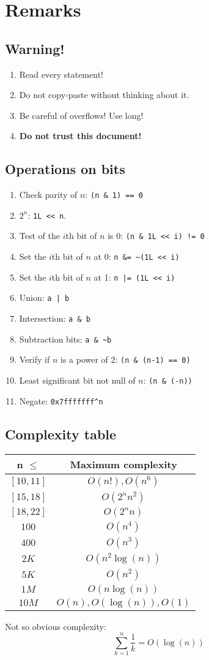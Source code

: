 \section{Remarks}
\subsection{Warning!}
\begin{enumerate}
	\item Read every statement!
	\item Do not copy-paste without thinking about it.
	\item Be careful of overflows! Use long!
	\item \textbf{Do not trust this document!}
\end{enumerate}
 
\subsection{Operations on bits}
\begin{enumerate}
	\item Check parity of $n$: \lstinline{(n & 1) == 0}
	\item $2^n$: \lstinline|1L << n|.
	\item Test of the $i$th bit of $n$ is $0$: \lstinline{(n & 1L << i) != 0}
	\item Set the $i$th bit of $n$ at 0: \lstinline{n &= ~(1L << i)}
	\item Set the $i$th bit of $n$ at 1: \lstinline{n |= (1L << i)}
	\item Union: \lstinline{a | b}
	\item Intersection: \lstinline{a & b}
	\item Subtraction bits: \lstinline{a & ~b}
	\item Verify if $n$ is a power of 2: \lstinline{(n & (n-1) == 0)}
	\item Least significant bit not null of $n$: \lstinline{(n & (-n))}
	\item Negate: \lstinline{0x7fffffff^n}
\end{enumerate}

\subsection{Complexity table}
\begin{center}
\begin{tabular}{|c|c|}
\hline
n $\leq$ & Maximum complexity\\
\hline
$[10,11]$ & $O(n!),O(n^6)$ \\
$[15,18]$ & $O(2^n n^2)$\\
$[18,22]$ & $O(2^n n)$\\
$100$ & $O(n^4)$\\
$400$ & $O(n^3)$\\
$2K$ & $O(n^2\log(n))$\\
$5K$ & $O(n^2)$\\
$1M$ & $O(n\log(n))$\\
$10M$ & $O(n),O(\log(n)),O(1)$\\
\hline
\end{tabular}
\end{center}
Not so obvious complexity:
$$\sum_{k=1}^n \frac{1}{k} = O(\log(n))$$

